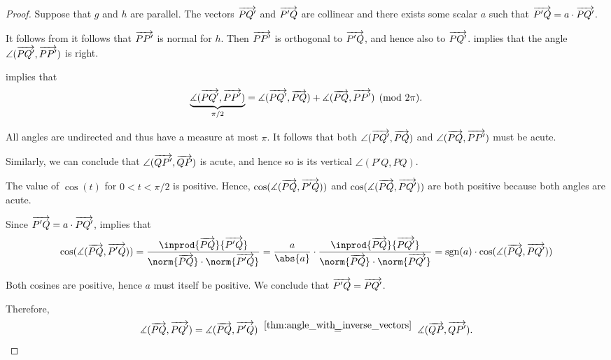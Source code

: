 \begin{proof}
   Suppose that \( g \) and \( h \) are parallel. The vectors \( \overrightarrow{PQ'} \) and \( \overrightarrow{P'Q} \) are collinear and there exists some scalar \( a \) such that \( \overrightarrow{P'Q} = a \cdot \overrightarrow{PQ'} \).

  It follows from  it follows that \( \overrightarrow{PP'} \) is normal for \( h \). Then \( \overrightarrow{PP'} \) is orthogonal to \( \overrightarrow{P'Q} \), and hence also to \( \overrightarrow{PQ'} \).  implies that the angle \( \angle(\overrightarrow{PQ'}, \overrightarrow{PP'}) \) is right.

   implies that
  \begin{equation*}
    \underbrace{\measuredangle(\overrightarrow{PQ'}, \overrightarrow{PP'})}_{\pi / 2} = \measuredangle(\overrightarrow{PQ'}, \overrightarrow{PQ}) + \measuredangle(\overrightarrow{PQ}, \overrightarrow{PP'}) \pmod {2\pi}.
  \end{equation*}

  All angles are undirected and thus have a measure at most \( \pi \). It follows that both \( \angle(\overrightarrow{PQ'}, \overrightarrow{PQ}) \) and \( \angle(\overrightarrow{PQ}, \overrightarrow{PP'}) \) must be acute.

  Similarly, we can conclude that \( \angle(\overrightarrow{QP'}, \overrightarrow{QP}) \) is acute, and hence so is its vertical \( \angle(P'Q, PQ) \).

  The value of \( \cos(t) \) for \( 0 < t < \pi / 2 \) is positive. Hence, \( \cos(\measuredangle(\overrightarrow{PQ}, \overrightarrow{P'Q})) \) and \( \cos(\measuredangle(\overrightarrow{PQ}, \overrightarrow{PQ'})) \) are both positive because both angles are acute.

  Since \( \overrightarrow{P'Q} = a \cdot \overrightarrow{PQ'} \),  implies that
  \begin{equation*}
    \cos(\measuredangle(\vect{PQ}, \vect{P'Q}))
    =
    \frac {\inprod {\vect{PQ}} {\vect{P'Q}}} {\norm{\vect{PQ}} \cdot \norm{\vect{P'Q}}}
    =
    \frac a {\abs{a}} \cdot \frac {\inprod {\vect{PQ}} {\vect{PQ'}}} {\norm{\vect{PQ}} \cdot \norm{\vect{PQ'}}}
    =
    \sgn(a) \cdot \cos(\measuredangle(\vect{PQ}, \vect{PQ'}))
  \end{equation*}

  Both cosines are positive, hence \( a \) must itself be positive. We conclude that \( \overrightarrow{P'Q} = \overrightarrow{PQ'} \).

  Therefore,
  \begin{equation*}
    \measuredangle(\vect{PQ}, \vect{PQ'})
    =
    \measuredangle(\vect{PQ}, \vect{P'Q})
    \reloset {\ref{thm:angle_with_inverse_vectors}} =
    \measuredangle(\vect{QP}, \vect{QP'}).
  \end{equation*}


\end{proof}
